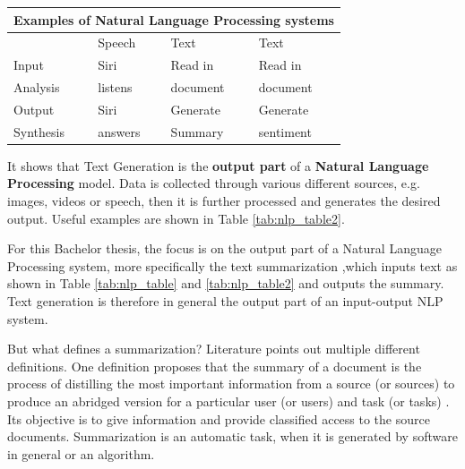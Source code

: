 \begin{center} 
	\begin{tabular}{ |p{3cm}||p{3cm}|p{3cm}|p{3cm}|}
		\hline
		\multicolumn{4}{|c|}{\textbf{Examples of Natural Language Processing systems}}\\ \hline\hline
		&Speech &Text &Text \\ \hline
		Input &Siri &Read in &Read in \\
		Analysis &listens  &document     &document \\ \hline \hline
		Output &Siri &\cellcolor[HTML]{F3E687}Generate &Generate \\
		Synthesis &answers & \cellcolor[HTML]{F3E687}Summary &sentiment \\ \hline
	\end{tabular}
	\label{tab:nlp_table2}
\end{center}

It shows that Text Generation is the \textbf{output part} of a \textbf{Natural Language Processing} model. Data is collected through various different sources, e.g. images, videos or speech, then it is further processed and generates the desired output. Useful examples are shown in Table \ref{tab:nlp_table2}.

For this Bachelor thesis, the focus is on the output part of a Natural Language Processing system, more specifically the text summarization ,which inputs text as shown in Table \ref{tab:nlp_table} and \ref{tab:nlp_table2} and outputs the summary. Text generation is therefore in general the output part of an input-output NLP system.

But what defines a summarization? Literature points out multiple different definitions. One definition proposes that the summary of a document is the process of distilling the most important information from a source (or sources) to produce an abridged version for a particular user (or users) and task (or tasks) \cite{def}. Its objective is to give information and provide classified access to the source documents. Summarization is an automatic task, when it is generated by software in general or an algorithm.

